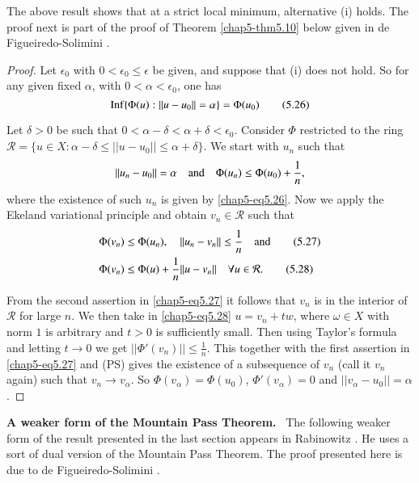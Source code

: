 \begin{remark*}
The above result shows that at a strict local minimum, alternative (i)
holds. The proof next is part of the proof of Theorem
\ref{chap5-thm5.10} below given in de Figueiredo-Solimini \cite{key43}.
\end{remark*}

\begin{proof}
Let $\epsilon_{0}$ with $0<\epsilon_{0}\leq \epsilon$ be given, and
suppose that (i) does not hold. So for any given fixed $\alpha$, with
$0<\alpha<\epsilon_{0}$, one has
\begin{equation*}
\operatorname{Inf}\{\Phi(u):||u-u_{0}||=\alpha\}=\Phi(u_{0})\tag{5.26}\label{chap5-eq5.26} 
\end{equation*}

Let $\delta>0$ be such that
$0<\alpha-\delta<\alpha+\delta<\epsilon_{0}$. Consider $\Phi$
restricted to the ring $\mathcal{R}=\{u\in X:\alpha-\delta\leq
||u-u_{0}||\leq \alpha+\delta\}$. We start with $u_{n}$ such that
$$
||u_{n}-u_{0}||=\alpha\quad \text{and}\quad \Phi(u_{n})\leq
\Phi(u_{0})+\frac{1}{n}, 
$$
where the existence of such $u_{n}$ is given by
\eqref{chap5-eq5.26}. Now we apply the Ekeland variational principle
and obtain $v_{n}\in \mathcal{R}$ such that
\begin{align*}
& \Phi(v_{n})\leq \Phi(u_{n}),\quad ||u_{n}-v_{n}||\leq
\frac{1}{n}\quad\text{and}\tag{5.27}\label{chap5-eq5.27}\\
& \Phi(v_{n})\leq \Phi(u)+\frac{1}{n}||u-v_{n}||\quad \forall u\in
\mathcal{R}.\tag{5.28}\label{chap5-eq5.28} 
\end{align*}\pageoriginale

From the second assertion in \eqref{chap5-eq5.27} it follows that
$v_n$ is in the interior of $\mathcal{R}$ for large $n$. We then take
in \eqref{chap5-eq5.28} $u=v_{n}+tw$, where $\omega\in X$ with norm
$1$ is arbitrary and $t>0$ is sufficiently small. Then using Taylor's
formula and letting $t\to 0$ we get $||\Phi'(v_{n})||\leq
\frac{1}{n}$. This together with the first assertion in
\eqref{chap5-eq5.27} and (PS) gives the existence of a subsequence of
$v_{n}$ (call it $v_n$ again) such that $v_{n}\to v_{\alpha}$. So
$\Phi(v_{\alpha})=\Phi(u_{0})$, $\Phi'(v_{\alpha})=0$ and
$||v_{\alpha}-u_{0}||=\alpha$. 
\end{proof}


\noindent
{\bf A weaker form of the Mountain Pass Theorem.}~ The following
wea\-ker form of the result presented in the last section appears in
Rabinowitz \cite{key68}. He uses a sort of dual version of the
Mountain Pass Theorem. The proof presented here is due to de
Figueiredo-Solimini \cite{key43}. 

